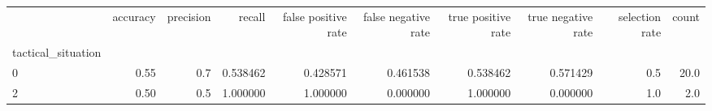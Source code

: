 \begin{tabular}{lrrrrrrrrr}
\toprule
{} &  accuracy &  precision &    recall &  false positive rate &  false negative rate &  true positive rate &  true negative rate &  selection rate &  count \\
tactical\_situation &           &            &           &                      &                      &                     &                     &                 &        \\
\midrule
0                  &      0.55 &        0.7 &  0.538462 &             0.428571 &             0.461538 &            0.538462 &            0.571429 &             0.5 &   20.0 \\
2                  &      0.50 &        0.5 &  1.000000 &             1.000000 &             0.000000 &            1.000000 &            0.000000 &             1.0 &    2.0 \\
\bottomrule
\end{tabular}
